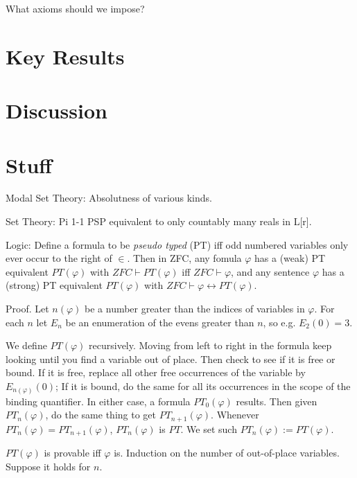 \documentclass{article}
\begin{document}
What axioms should we impose?
\section{Key Results}
\section{Discussion}
\section{Stuff}
Modal Set Theory:
Absolutness of various kinds.

Set Theory: 
Pi 1-1 PSP equivalent to only countably many reals in L[r].

Logic: 
Define a formula to be \emph{pseudo typed} (PT) iff 
odd numbered variables only ever occur
to the right of $\in$. 
Then in ZFC, any fomula $\varphi$ has a (weak) PT equivalent
$PT(\varphi)$ with $ZFC \vdash PT(\varphi)$ iff $ZFC \vdash \varphi$, 
and any sentence 
$\varphi$ has a (strong) PT equivalent $PT(\varphi)$ with 
$ZFC \vdash \varphi \leftrightarrow PT(\varphi)$.

Proof. Let $n(\varphi)$ be a number greater than the indices of variables in 
$\varphi$. For each $n$ let $E_n$ be an enumeration of 
the evens greater than $n$, so e.g. $E_2(0)=3$. 

We define $PT(\varphi)$ recursively. Moving from left to right in the formula 
keep looking until you find a variable out of place. Then check to see 
if it is free or bound. If it is free, replace all other free occurrences of the 
variable by $E_{n(\varphi)}(0)$; If 
it is bound, do the same for all its occurrences in the scope 
of the binding quantifier. In either case, a formula $PT_0(\varphi)$
results. Then given $PT_n(\varphi)$, do the same thing to get $PT_{n+1}(\varphi)$.
Whenever $PT_n(\varphi) = PT_{n+1}(\varphi)$, $PT_n(\varphi)$ is $PT$. We set 
such $PT_n(\varphi) := PT(\varphi)$.

$PT(\varphi)$ is provable iff $\varphi$ is. Induction on the number of out-of-place 
variables. Suppose it holds for $n$. 
\end{document}
